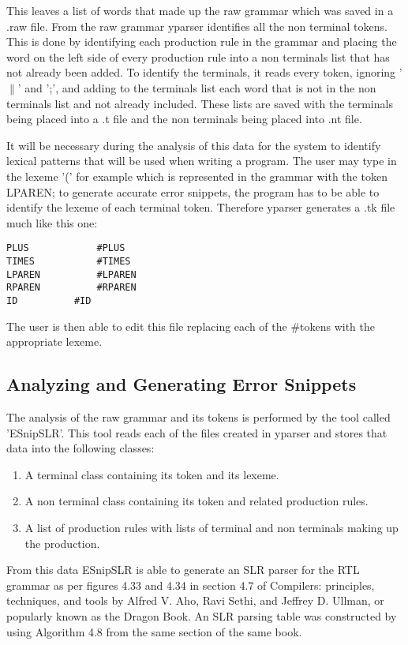 \documentclass{article}
\begin{document}
This leaves a list of words that made up the raw grammar which was saved in a .raw file.  From the raw grammar yparser identifies all the non terminal tokens.  This is done by identifying each production rule in the grammar and placing the word on the left side of every production rule into a non terminals list that has not already been added.  To identify the terminals, it reads every token, ignoring '$\|$' and ';', and adding to the terminals list each word that is not in the non terminals list and not already included.  These lists are saved with the terminals being placed into a .t file and the non terminals being placed into .nt file.

It will be necessary during the analysis of this data for the system to identify lexical patterns that will be used when writing a program.  The user may type in the lexeme '(' for example which is represented in the grammar with the token LPAREN; to generate accurate error snippets, the program has to be able to identify the lexeme of each terminal token.  Therefore yparser generates a .tk file much like this one:

\begin{verbatim}
PLUS			#PLUS
TIMES			#TIMES
LPAREN			#LPAREN
RPAREN			#RPAREN
ID			#ID
\end{verbatim}

The user is then able to edit this file replacing each of the \#tokens with the appropriate lexeme.

\subsection{Analyzing and Generating Error Snippets}
The analysis of the raw grammar and its tokens is performed by the tool called 'ESnipSLR'.  This tool reads each of the files created in yparser and stores that data into the following classes:
 
\begin{enumerate}
\item A terminal class containing its token and its lexeme.
\item A non terminal class containing its token and related production rules.
\item A list of production rules with lists of terminal and non terminals making up the production.
\end{enumerate}

From this data ESnipSLR is able to generate an SLR parser for the RTL grammar as per figures 4.33 and 4.34 in section 4.7 of Compilers: principles, techniques, and tools by Alfred V. Aho, Ravi Sethi, and Jeffrey D. Ullman, or popularly known as the Dragon Book.  An SLR parsing table was constructed by using Algorithm 4.8 from the same section of the same book. ~\cite{aho}
\end{document}
